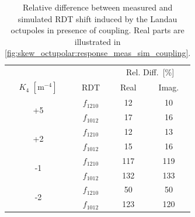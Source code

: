 \begin{table}[!htb]
    \centering
    \begin{tabular}{cccc}
    \toprule
    &&\multicolumn{2}{c}{Rel. Diff. [\%]} \\
    \cmidrule{3-4}
    $K_4$ $[\text{m}^{-4}]$ & RDT & Real & Imag. \\
    \midrule
    \multirow{2}{*}{+5}
     & $f_{1210}$ & 12  & 10  \\
     & $f_{1012}$ & 17  & 16  \\[0.5em]
    \multirow{2}{*}{+2}
     & $f_{1210}$ & 12  & 13  \\
     & $f_{1012}$ & 15  & 16  \\[0.5em]
    \multirow{2}{*}{-1}
     & $f_{1210}$ & 117 & 119 \\
     & $f_{1012}$ & 132 & 133 \\[0.5em]
    \multirow{2}{*}{-2}
     & $f_{1210}$ & 50  & 50  \\
     & $f_{1012}$ & 123 & 120 \\
    \bottomrule
    \end{tabular}
    \caption{Relative difference between measured and simulated RDT shift induced by the
    Landau octupoles in presence of coupling. Real parts are illustrated in
    \cref{fig:skew_octupolar:response_meas_sim_coupling}.}
    \label{tab:skew_octupolar:rms_ratios}
\end{table}



\FloatBarrier
\section{}